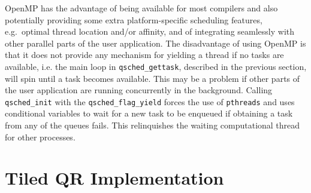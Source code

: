 \documentclass[preprint]{elsarticle}
\begin{document}
OpenMP has the advantage of being available for most compilers
and also potentially providing some extra platform-specific
scheduling features, e.g.~optimal thread location and/or affinity,
and of integrating seamlessly with other parallel parts of the
user application.
The disadvantage of using OpenMP is that it does not provide
any mechanism for yielding a thread if no tasks are available,
i.e. the main loop in {\tt qsched\_gettask}, described in the
previous section, will spin until a task becomes available.
This may be a problem if other parts of the user application
are running concurrently in the background.
Calling {\tt qsched\_init} with the {\tt qsched\_flag\_yield}
forces the use of {\tt pthreads} and uses conditional variables
to wait for a new task to be enqueued if obtaining a task
from any of the queues fails.
This relinquishes the waiting computational thread for other
processes.


\section{Tiled QR Implementation}
\end{document}

